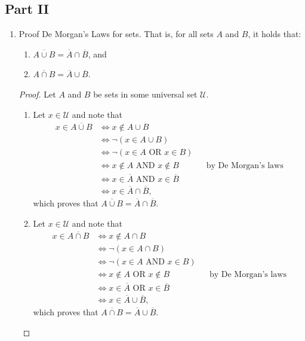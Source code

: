 \documentclass[11pt]{article}
\begin{document}
\subsection*{Part II}
\begin{enumerate}
 \item Proof De Morgan's Laws for sets. That is, for all sets $A$ and $B$, it holds that:
 \begin{enumerate}
  \item $\overline{A\cup B} = \overline{A}\cap \overline{B}$, and 
  \item $\overline{A\cap B} = \overline{A}\cup \overline{B}$. 
 \end{enumerate}

\begin{Solution}
 \begin{proof}
  Let $A$ and $B$ be sets in some universal set $\mathcal{U}$. 
  \begin{enumerate}
   \item Let $x\in \mathcal{U}$ and note that 
   \begin{align*}
    x\in \overline{A\cup B} 
     & \iff x\notin A\cup B\\
     & \iff \neg (x\in A\cup B)\\
     & \iff \neg (x\in A \text{ OR } x\in B)\\
     & \iff x\notin A \text{ AND } x\notin B&&\text{by De Morgan's laws}\\
     & \iff x\in \overline{A} \text{ AND } x\in \overline{B}\\
     & \iff x\in \overline{A}\cap\overline{B},
   \end{align*}
which proves that $\overline{A\cup B} = \overline{A}\cap \overline{B}$.
\item Let $x\in \mathcal{U}$ and note that 
   \begin{align*}
    x\in \overline{A\cap B} 
     & \iff x\notin A\cap B\\
     & \iff \neg (x\in A\cap B)\\
     & \iff \neg (x\in A \text{ AND } x\in B)\\
     & \iff x\notin A \text{ OR } x\notin B&&\text{by De Morgan's laws}\\
     & \iff x\in \overline{A} \text{ OR } x\in \overline{B}\\
     & \iff x\in \overline{A}\cup\overline{B},
   \end{align*}
which proves that $\overline{A\cap B} = \overline{A}\cup \overline{B}$.
  \end{enumerate}


\end{proof}
\end{Solution}
\end{enumerate}
\end{document}
